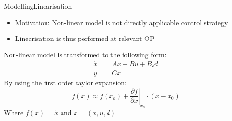 
\begin{frame}{Modelling}{Linearisation}
	\begin{itemize}
		\item Motivation: Non-linear model is not directly applicable control strategy 
		\item Linearisation is thus performed at relevant OP
	\end{itemize}
	Non-linear model is transformed to the following form:
	\begin{equation} \label{eq:state_space}
		\begin{split}
			\dot{x} & = Ax + Bu + B_dd \\
			y 		& = Cx
		\end{split}
	\end{equation}
	By using the first order taylor expansion:
	\begin{equation}
		f(x) \approx f(x_o) + \left. \dfrac{\partial f}{\partial x} \right |_{x_o} \cdot (x-x_0)		
	\end{equation}
	Where $f(x)$ = $\dot{x}$ and $x = (x, u, d)$


\end{frame}




